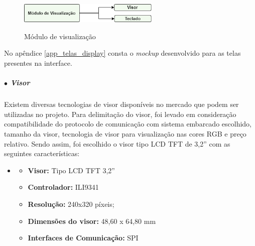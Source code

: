     \begin{figure}[H]
    \centering
    {\includegraphics[width=0.6\textwidth]{figuras/eletronica/esquematicos/m_visualizacao.png}}
    \caption{Módulo de visualização} 
    \label{fig:modulo_visualizacao}
\end{figure}
    
    No apêndice \ref{app_telas_display} consta o \textit{mockup} desenvolvido para as telas presentes na interface.
    
        \subparagraph*{$\bullet$ \textbf{Visor}} \hfill
        
        Existem diversas tecnologias de visor disponíveis no mercado que podem ser utilizadas no projeto. Para delimitação do visor, foi levado em consideração compatibilidade do protocolo de comunicação com sistema embarcado escolhido, tamanho da visor, tecnologia de visor para visualização nas cores RGB e preço relativo. Sendo assim, foi escolhido o visor tipo LCD TFT de 3,2'' com as seguintes características:
        
        \begin{itemize}
        	\item[ ] 
        	\begin{itemize}
        		\item \textbf{Visor:} Tipo LCD TFT 3,2'' 
        		\item \textbf{Controlador:} ILI9341
        		\item \textbf{Resolução:} 240x320 píxeis;
        		\item \textbf{Dimensões do visor:} 48,60 x 64,80 mm
        		\item \textbf{Interfaces de Comunicação:} SPI
        	\end{itemize}
        \end{itemize}
        
